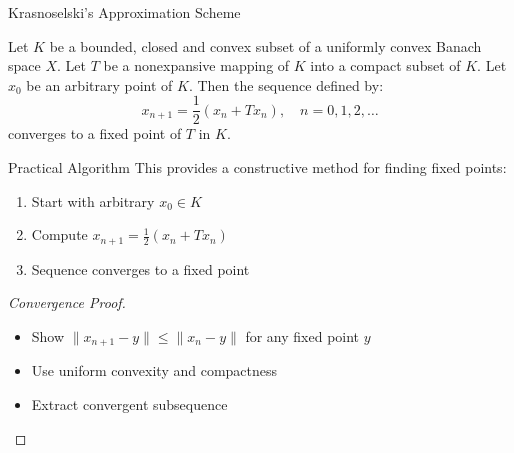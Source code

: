 \documentclass[aspectratio=169,10pt]{beamer}
\begin{document}
\begin{frame}[allowframebreaks]{Krasnoselski's Approximation Scheme}
    \begin{theorem}
        Let $K$ be a bounded, closed and convex subset of a uniformly convex Banach space $X$. Let $T$ be a nonexpansive mapping of $K$ into a compact subset of $K$. Let $x_0$ be an arbitrary point of $K$. Then the sequence defined by:
        \[
        x_{n+1} = \frac{1}{2}(x_n + Tx_n), \quad n = 0, 1, 2, \ldots
        \]
        converges to a fixed point of $T$ in $K$.
    \end{theorem}

    \begin{block}{Practical Algorithm}
        This provides a constructive method for finding fixed points:
        \begin{enumerate}
            \item Start with arbitrary $x_0 \in K$
            \item Compute $x_{n+1} = \tfrac{1}{2}(x_n + Tx_n)$
            \item Sequence converges to a fixed point
        \end{enumerate}
    \end{block}

    \begin{proof}[Convergence Proof]
        \begin{itemize}
            \item Show $\|x_{n+1} - y\| \le \|x_n - y\|$ for any fixed point $y$
            \item Use uniform convexity and compactness
            \item Extract convergent subsequence
        \end{itemize}
    \end{proof}
\end{frame}
\end{document}
